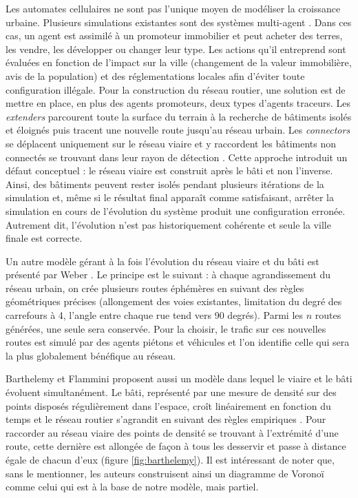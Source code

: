 \documentclass[12pt]{article}
\begin{document}
Les automates cellulaires ne sont pas l'unique moyen de modéliser la
croissance urbaine. Plusieurs simulations existantes sont des systèmes
multi-agent \cite{Lechner2003,Lechner2004}. Dans ces cas, un agent est
assimilé à un promoteur immobilier et peut acheter des terres, les
vendre, les développer ou changer leur type. Les actions qu'il
entreprend sont évaluées en fonction de l'impact sur la ville
(changement de la valeur immobilière, avis de la population) et des
réglementations locales afin d'éviter toute configuration illégale.
Pour la construction du réseau routier, une solution est de mettre en
place, en plus des agents promoteurs, deux types d'agents
traceurs. Les \textit{extenders} parcourent toute la surface du
terrain à la recherche de bâtiments isolés et éloignés puis tracent
une nouvelle route jusqu'au réseau urbain. Les \textit{connectors} se
déplacent uniquement sur le réseau viaire et y raccordent les
bâtiments non connectés se trouvant dans leur rayon de détection
\cite{Lechner2003}. Cette approche introduit un défaut conceptuel : le
réseau viaire est construit après le bâti et non l'inverse. Ainsi,
des bâtiments peuvent rester isolés pendant plusieurs itérations de la
simulation et, même si le résultat final apparaît comme satisfaisant,
arrêter la simulation en cours de l'évolution du système produit une
configuration erronée. Autrement dit, l'évolution n'est pas
historiquement cohérente et seule la ville finale est correcte.

Un autre modèle gérant à la fois l'évolution du réseau viaire et du
bâti est présenté par Weber \cite{Weber2009}. Le principe est le
suivant : à chaque agrandissement du réseau urbain, on crée plusieurs
routes éphémères en suivant des règles géométriques précises
(allongement des voies existantes, limitation du degré des carrefours
à 4, l'angle entre chaque rue tend vers 90 degrés). Parmi les $n$
routes générées, une seule sera conservée. Pour la choisir, le trafic
sur ces nouvelles routes est simulé par des agents piétons et
véhicules et l'on identifie celle qui sera la plus globalement
bénéfique au réseau.

Barthelemy et Flammini \cite{Barthelemy2009} proposent aussi un modèle
dans lequel le viaire et le bâti évoluent simultanément. Le bâti,
représenté par une mesure de densité sur des points disposés
régulièrement dans l'espace, croît linéairement en fonction du temps
et le réseau routier s'agrandit en suivant des règles empiriques
\cite{Barthelemy2008}. Pour raccorder au réseau viaire des points de
densité se trouvant à l'extrémité d'une route, cette dernière est
allongée de façon à tous les desservir et passe à distance égale de
chacun d'eux (figure \ref{fig:barthelemy}). Il est intéressant de
noter que, sans le mentionner, les auteurs construisent ainsi un
diagramme de Voronoï comme celui qui est à la base de notre modèle,
mais partiel.
\end{document}
